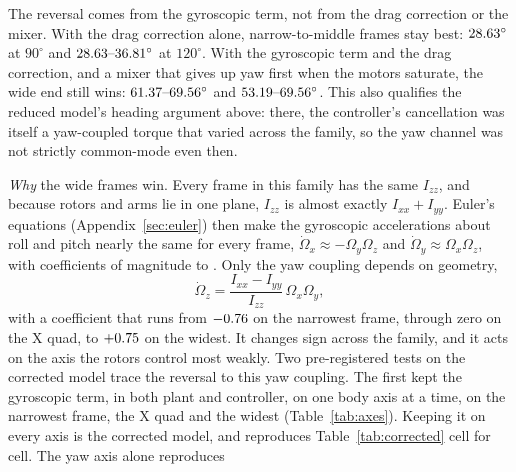 \documentclass[11pt,a4paper]{article}
\begin{document}
The reversal comes from the gyroscopic term, not from the drag correction or the
mixer. With the drag correction alone, narrow-to-middle frames stay best:
$28.63^\circ$ at $90^\circ$ and
$28.63\text{--}36.81^\circ$ at $120^\circ$. With the gyroscopic term and
the drag correction, and a mixer that gives up yaw first when the motors
saturate, the wide end still wins: $61.37\text{--}69.56^\circ$ and $53.19\text{--}69.56^\circ$. This
also qualifies the reduced model's heading argument above: there, the
controller's cancellation was itself a yaw-coupled torque that varied across the
family, so the yaw channel was not strictly common-mode even then.

\emph{Why} the wide frames win. Every frame in this family has the same
$I_{zz}$, and because rotors and arms lie in one plane, $I_{zz}$ is almost exactly
$I_{xx}+I_{yy}$. Euler's equations (Appendix~\ref{sec:euler}) then make the
gyroscopic accelerations about
roll and pitch nearly the same for every frame,
$\dot\Omega_x \approx -\Omega_y\Omega_z$ and $\dot\Omega_y \approx \Omega_x\Omega_z$,
with coefficients of magnitude \EulerRPMin{} to \EulerRPMax{}. Only the yaw
coupling depends on geometry,
\[
  \dot\Omega_z = \frac{I_{xx}-I_{yy}}{I_{zz}}\,\Omega_x\Omega_y ,
\]
with a coefficient that runs from $-0.76$ on the narrowest frame, through
zero on the X quad, to $+0.75$ on the widest. It changes sign across the
family, and it acts on the axis the rotors control most weakly.
Two pre-registered tests on the corrected model trace the reversal to this yaw
coupling. The first kept the gyroscopic term, in both plant and controller, on
one body axis at a time, on the narrowest frame, the X quad and the widest
(Table~\ref{tab:axes}). Keeping it on every axis is the corrected model, and
reproduces Table~\ref{tab:corrected} cell for cell. The yaw axis alone reproduces
\end{document}
